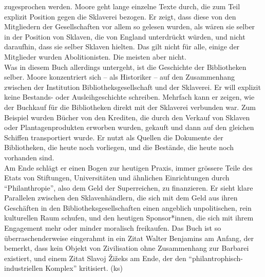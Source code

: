 \documentclass[a4paper,
fontsize=11pt,
oneside,
numbers=noperiodatend,
parskip=half-,
bibliography=totoc,
final
]{scrartcl}
\begin{document}
zugesprochen werden. Moore geht lange einzelne Texte durch, die zum Teil
explizit Position gegen die Sklaverei bezogen. Er zeigt, dass diese von
den Mitgliedern der Gesellschaften vor allem so gelesen wurden, als
wären sie selber in der Position von Sklaven, die von England
unterdrückt würden, und nicht daraufhin, dass sie selber Sklaven
hielten. Das gilt nicht für alle, einige der Mitglieder wurden
Abolitionisten. Die meisten aber nicht.\\
Was in diesem Buch allerdings untergeht, ist die Geschichte der
Bibliotheken selber. Moore konzentriert sich -- als Historiker -- auf
den Zusammenhang zwischen der Institution Bibliotheksgesellschaft und
der Sklaverei. Er will explizit keine Bestands- oder Ausleihgeschichte
schreiben. Mehrfach kann er zeigen, wie der Buchkauf für die
Bibliotheken direkt mit der Sklaverei verbunden war. Zum Beispiel wurden
Bücher von den Krediten, die durch den Verkauf von Sklaven oder
Plantagenprodukten erworben wurden, gekauft und dann auf den gleichen
Schiffen transportiert wurde. Er nutzt als Quellen die Dokumente der
Bibliotheken, die heute noch vorliegen, und die Bestände, die heute noch
vorhanden sind.\\
Am Ende schlägt er einen Bogen zur heutigen Praxis, immer grössere Teile
des Etats von Stiftungen, Universitäten und ähnlichen Einrichtungen
durch ``Philanthropie'', also dem Geld der Superreichen, zu finanzieren.
Er sieht klare Parallelen zwischen den Sklavenhändlern, die sich mit dem
Geld aus ihren Geschäften in den Bibliotheksgesellschaften einen
angeblich unpolitischen, rein kulturellen Raum schufen, und den heutigen
Sponsor*innen, die sich mit ihrem Engagement mehr oder minder moralisch
freikaufen. Das Buch ist so überraschenderweise eingerahmt in ein Zitat
Walter Benjamins am Anfang, der bemerkt, dass kein Objekt von
Zivilisation ohne Zusammenhang zur Barbarei existiert, und einem Zitat
Slavoj Žižeks am Ende, der den ``philantrophisch-industriellen Komplex''
kritisiert. (ks)
\end{document}

